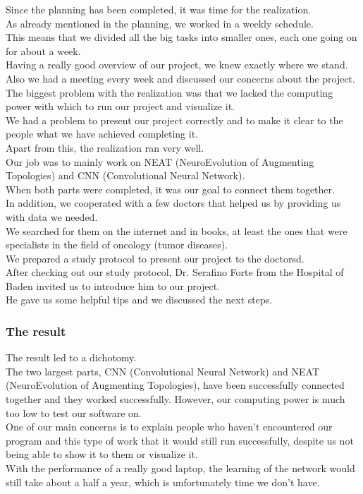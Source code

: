  Since the planning has been completed, it was time for the realization. \\
As already mentioned in the planning, we worked in a weekly schedule. \\
This means that we divided all the big tasks into smaller ones, each one going on for about a week. \\
Having a really good overview of our project, we knew exactly where we stand. \\
Also we had a meeting every week and discussed our concerns about the project. \\
The biggest problem with the realization was that we lacked the computing power with which to run our project and visualize it. \\
We had a problem to present our project correctly and to make it clear to the people what we have achieved completing it. \\
Apart from this, the realization ran very well.\\
Our job was to mainly work on NEAT (NeuroEvolution of Augmenting Topologies) and CNN (Convolutional Neural Network). \\
When both parts were completed, it was our goal to connect them together. \\
In addition, we cooperated with a few doctors that helped us by providing us with data we needed.  \\
We searched for them on the internet and in books, at least the ones that were specialists in the field of oncology (tumor diseases). \\
We prepared a study protocol to present our project to the doctorsd. \\
After checking out our study protocol, Dr. Serafino Forte from the Hospital of Baden invited us to introduce him to our project. \\
He gave us some helpful tips and we discussed the next steps. \\

\subsubsection{The result}

The result led to a dichotomy. \\
The two largest parts, CNN (Convolutional Neural Network) and NEAT (NeuroEvolution of Augmenting Topologies), have been successfully connected together and they worked successfully. However, our computing power is much too low to test our software on. \\
One of our main concerns is to explain people who haven't encountered our program and this type of work that it would still run successfully, despite us not being able to show it to them or visualize it. \\
With the performance of a really good laptop, the learning of the network would still take about a half a year, which is  unfortunately time we don't have.\\

